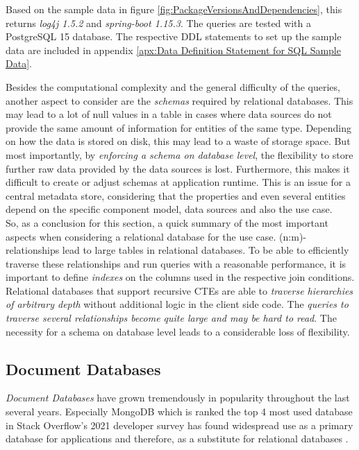 Based on the sample data in figure \ref{fig:PackageVersionsAndDependencies}, this returns \emph{log4j 1.5.2} and \emph{spring-boot 1.15.3}. The queries are tested with a PostgreSQL 15 database. The respective DDL statements to set up the sample data are included in appendix \ref{apx:Data Definition Statement for SQL Sample Data}.\par
Besides the computational complexity and the general difficulty of the queries, another aspect to consider are the \emph{schemas} required by relational databases. This may lead to a lot of null values in a table in cases where data sources do not provide the same amount of information for entities of the same type. Depending on how the data is stored on disk, this may lead to a waste of storage space. But most importantly, by \emph{enforcing a schema on database level}, the flexibility to store further raw data provided by the data sources is lost. Furthermore, this makes it difficult to create or adjust schemas at application runtime. This is an issue for a central metadata store, considering that the properties and even several entities depend on the specific component model, data sources and also the use case.\\

So, as a conclusion for this section, a quick summary of the most important aspects when considering a relational database for the use case. 
(n:m)-relationships lead to large tables in relational databases. To be able to efficiently traverse these relationships and run queries with a reasonable performance, it is important to define \emph{indexes} on the columns used in the respective join conditions. Relational databases that support recursive CTEs are able to \emph{traverse hierarchies of arbitrary depth} without additional logic in the client side code. The \emph{queries to traverse several relationships become quite large and may be hard to read}. The necessity for a schema on database level leads to a considerable loss of flexibility. 
 
\subsection{Document Databases}
\emph{Document Databases} have grown tremendously in popularity throughout the last several years. Especially MongoDB which is ranked the top 4 most used database in Stack Overflow's 2021 developer survey has found widespread use as a primary database for applications and therefore, as a substitute for relational databases \cite{StackoverflowDeveloperSurvey}.


